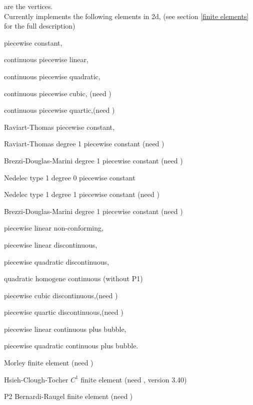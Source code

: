 \documentclass[a4paper,twoside,12pt]{book}
\begin{document}
are the vertices.
\\
Currently \freefempp implements the following elements  in 2d, (see section \ref{finite elements} for the full description)
{\parskip=0cm
\par {} piecewise constant,
\par {} continuous piecewise linear,
\par {} continuous piecewise quadratic,
\par {} continuous piecewise cubic, (need  )
\par {} continuous piecewise quartic,(need  )
\par {} Raviart-Thomas piecewise constant,
\par {} Raviart-Thomas degree 1  piecewise constant (need  )
\par {} Brezzi-Douglas-Marini degree 1  piecewise constant (need  )
\par {} Nedelec type 1 degree 0  piecewise constant 
\par {} Nedelec type 1 degree 1  piecewise constant (need  )
\par {} Brezzi-Douglas-Marini degree 1  piecewise constant (need  )
\par {} piecewise linear non-conforming,
\par {} piecewise linear discontinuous,
\par {} piecewise quadratic discontinuous,
\par {}  quadratic homogene continuous (without P1)
\par {} piecewise cubic discontinuous,(need  )
\par {} piecewise quartic discontinuous,(need  )
\par {} piecewise linear continuous plus bubble,
\par {} piecewise quadratic continuous plus bubble.
\par {} Morley finite element (need   )
\par {} Hsieh-Clough-Tocher $C^1$ finite element (need   , version 3.40)
\par {} P2 Bernardi-Raugel finite element  (need   )

}
\end{document}
